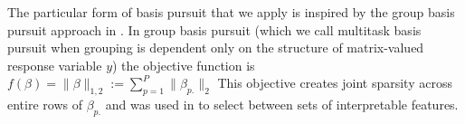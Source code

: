 The particular form of basis pursuit that we apply is inspired by the group basis pursuit approach in \citet{Koelle2022-ju}.
In group basis pursuit (which we call multitask basis pursuit when grouping is dependent only on the structure of matrix-valued response variable $y$) the objective function is $f(\beta) = \|\beta\|_{1,2} := \sum_{p=1}^P \|\beta_{p.}\|_2$  \citep{Yuan2006-bt, Obozinski2006-kq, Yeung2011-fg}
This objective creates joint sparsity across entire rows of $\beta_{p.}$ and was used in \citep{Koelle2022-ju} to select between sets of interpretable features.
